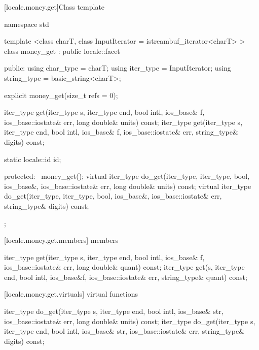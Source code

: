 [locale.money.get]{Class template }

%
\begin{codeblock}
namespace std {
  template <class charT,
    class InputIterator = istreambuf_iterator<charT> >
  class money_get : public locale::facet {
  public:
    using char_type   = charT;
    using iter_type   = InputIterator;
    using string_type = basic_string<charT>;

    explicit money_get(size_t refs = 0);

    iter_type get(iter_type s, iter_type end, bool intl,
                  ios_base& f, ios_base::iostate& err,
                  long double& units) const;
    iter_type get(iter_type s, iter_type end, bool intl,
                  ios_base& f, ios_base::iostate& err,
                  string_type& digits) const;

    static locale::id id;

  protected:
    ~money_get();
    virtual iter_type do_get(iter_type, iter_type, bool, ios_base&,
                             ios_base::iostate& err, long double& units) const;
    virtual iter_type do_get(iter_type, iter_type, bool, ios_base&,
                             ios_base::iostate& err, string_type& digits) const;
  };
}
\end{codeblock}

[locale.money.get.members]{ members}

%
\begin{itemdecl}
iter_type get(iter_type s, iter_type end, bool intl,
              ios_base& f, ios_base::iostate& err,
              long double& quant) const;
iter_type get(s, iter_type end, bool intl, ios_base&f,
              ios_base::iostate& err, string_type& quant) const;
\end{itemdecl}

\begin{itemdescr}
\pnum
\returns
{}
\end{itemdescr}

[locale.money.get.virtuals]{ virtual functions}

%
\begin{itemdecl}
iter_type do_get(iter_type s, iter_type end, bool intl,
                 ios_base& str, ios_base::iostate& err,
                 long double& units) const;
iter_type do_get(iter_type s, iter_type end, bool intl,
                 ios_base& str, ios_base::iostate& err,
                 string_type& digits) const;
\end{itemdecl}

